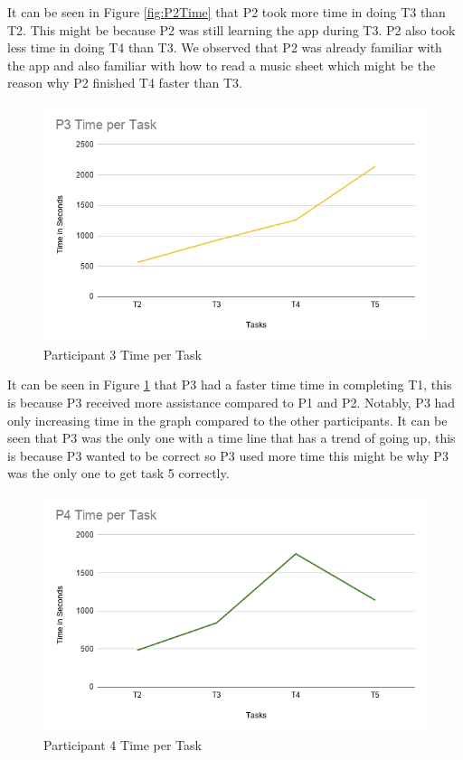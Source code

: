 It can be seen in Figure \ref{fig:P2Time} that P2 took more time in doing T3 than T2. This might be because P2 was still learning the app during T3. P2 also took less time in doing T4 than T3. We observed that P2 was already familiar with the app and also familiar with how to read a music sheet which might be the reason why P2 finished T4 faster than T3. 

\begin{figure}[H]
    \centering
    \includegraphics[width=15cm]{figures/Results/P3Time.png}
    \caption{Participant 3 Time per Task}
    \label{fig:P3Time}
\end{figure}

It can be seen in Figure \ref{fig:P3Time} that P3 had a faster time time in completing T1, this is because P3 received more assistance compared to P1 and P2. Notably, P3 had only increasing time in the graph compared to the other participants. It can be seen that P3 was the only one with a time line that has a trend of going up, this is because P3 wanted to be correct so P3 used more time this might be why P3 was the only one to get task 5 correctly. 


\begin{figure}[H]
    \centering
    \includegraphics[width=15cm]{figures/Results/P4Time.png}
    \caption{Participant 4 Time per Task}
    \label{fig:P4Time}
\end{figure}

